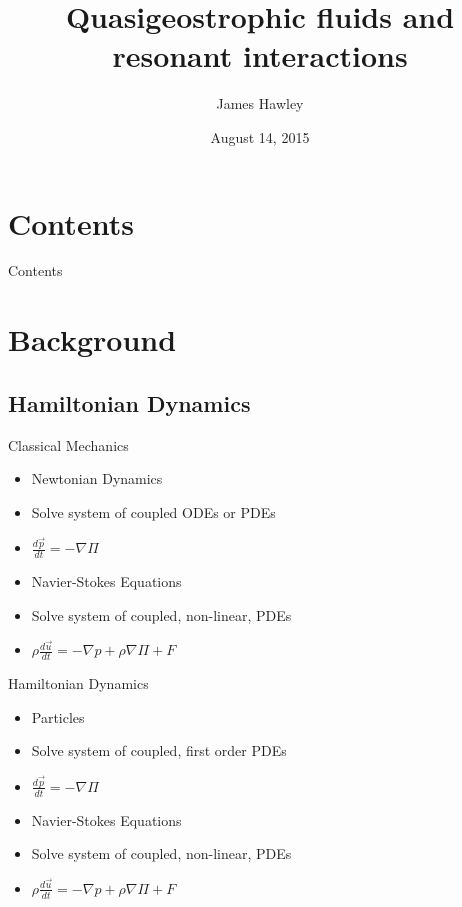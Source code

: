 \documentclass{beamer}
\title{Quasigeostrophic fluids and resonant interactions}
\author{James Hawley}
\date{August 14, 2015}
\institute{University of Waterloo}
\begin{document}
	\begin{frame}
		\titlepage
	\end{frame}

	\section*{Contents}
		\begin{frame}{Contents}
			\tableofcontents
		\end{frame}

	\section{Background}
		\subsection{Hamiltonian Dynamics}
			\begin{frame}[t]{Classical Mechanics}
				\begin{minipage}{0.45\textwidth}
					\begin{itemize}
						\item<2-> Newtonian Dynamics
						\item<3-> Solve system of coupled ODEs or PDEs
						\item<3-> $\frac{d \vec p}{dt} = -\nabla \Pi$
					\end{itemize}
				\end{minipage}
				\begin{minipage}{0.45\textwidth}
					\begin{itemize}
						\item<4-> Navier-Stokes Equations
						\item<5-> Solve system of coupled, non-linear, PDEs
						\item<5-> $\rho\frac{d \vec u}{dt} = -\nabla p + \rho \nabla \Pi + F$
					\end{itemize}
				\end{minipage}
			\end{frame}
			\begin{frame}[t]{Hamiltonian Dynamics}
				\begin{minipage}{0.45\textwidth}
					\begin{itemize}
						\item<2-> Particles
						\item<3-> Solve system of coupled, first order PDEs
						\item<3-> $\frac{d \vec p}{dt} = -\nabla \Pi$
					\end{itemize}
				\end{minipage}
				\begin{minipage}{0.45\textwidth}
					\begin{itemize}
						\item<4-> Navier-Stokes Equations
						\item<5-> Solve system of coupled, non-linear, PDEs
						\item<5-> $\rho\frac{d \vec u}{dt} = -\nabla p + \rho \nabla \Pi + F$
					\end{itemize}
				\end{minipage}
			\end{frame}
\end{document}
